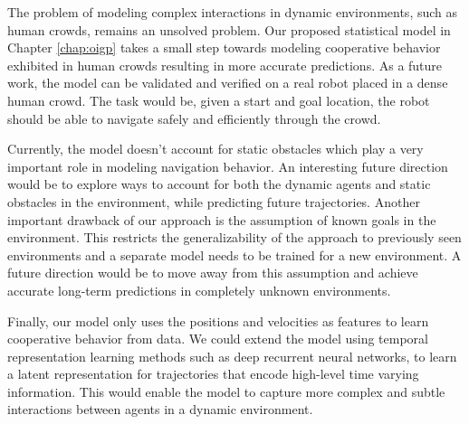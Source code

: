 The problem of modeling complex interactions in dynamic environments, such as human crowds, remains an unsolved problem. Our proposed statistical model in Chapter \ref{chap:oigp} takes a small step towards modeling cooperative behavior exhibited in human crowds resulting in more accurate predictions. As a future work, the model can be validated and verified on a real robot placed in a dense human crowd. The task would be, given a start and goal location, the robot should be able to navigate safely and efficiently through the crowd.

Currently, the model doesn't account for static obstacles which play a
very important role in modeling navigation behavior. An interesting
future direction would be to explore ways to account for both the
dynamic agents and static obstacles in the environment, while
predicting future trajectories. Another important drawback of our approach is
the assumption of known goals in the environment. This
restricts the generalizability of the approach to previously
seen environments and a separate model needs to be trained
for a new environment. A future direction would be to move away from this assumption and achieve accurate long-term predictions in completely unknown environments.

Finally, our model only uses the positions and velocities as features to learn cooperative behavior from data. We could extend the model using temporal representation learning methods such as deep recurrent neural networks, to learn a latent representation for trajectories that encode high-level time varying information. This would enable the model to capture more complex and subtle interactions between agents in a dynamic environment.


